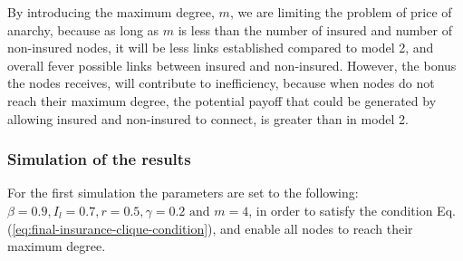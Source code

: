 By introducing the maximum degree, $m$, we are limiting the problem of price of anarchy, because as long as $m$ is less than the number of insured and number of non-insured nodes, it will be less links established compared to model 2, and overall fever possible links between insured and non-insured. However, the bonus the nodes receives, will contribute to  inefficiency, because when nodes do not reach their maximum degree, the potential payoff that could be generated by allowing insured and non-insured to connect, is greater than in model 2.


\subsubsection{Simulation of the results}
For the first simulation the parameters are set to the following: $\beta=0.9, I_{l}=0.7, r=0.5, \gamma=0.2 \text{ and }m=4$, in order to satisfy the condition Eq.(\ref{eq:final-insurance-clique-condition}), and enable all nodes to reach their maximum degree.  

